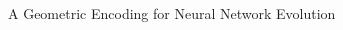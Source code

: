 \begin{frame}{\tciii{} A Geometric Encoding for Neural Network Evolution}
    \begin{columns}
    \begin{column}{0.45\linewidth}
    \begin{center}
    \end{center}
    \end{column}
    
    \begin{column}{0.45\linewidth}
    \begin{center}
    
    \end{center}
    \end{column}
    \end{columns}
    
\end{frame}


